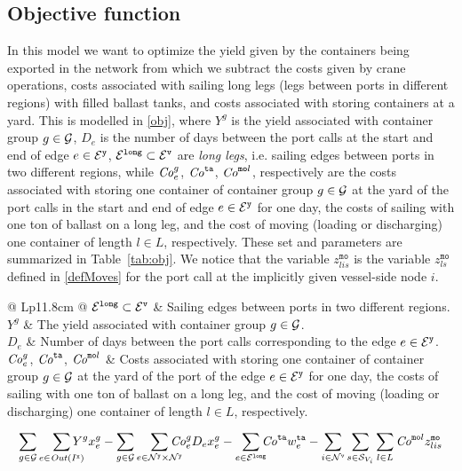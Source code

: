 \subsection{Objective function}
In this model we want to optimize the yield given by the containers being exported in the network from which we subtract the costs given by crane operations, costs associated with sailing long legs (legs between ports in different regions) with filled ballast tanks, and costs associated with storing containers at a yard. This is modelled in \eqref{obj}, where $Y^g$ is the yield associated with container group $g\in\mathcal{G}$, $D_e$ is the number of days between the port calls at the start and end of edge $e\in \mathcal{E}^\texttt{y}$, $\mathcal{E}^\texttt{long}\subset\mathcal{E}^\texttt{v}$ are \emph{long legs}, i.e. sailing edges between ports in two different regions, while $\mathit{Co}^g_{e}$, $\mathit{Co}^\texttt{ta}$, $\mathit{Co}^{\texttt{mo}l}$, respectively are the costs associated with storing one container of container group $g\in\mathcal{G}$ at the yard of the port calls in the start and end of edge $e\in\mathcal{E}^\texttt{y}$ for one day, the costs of sailing with one ton of ballast on a long leg, and the cost of moving (loading or discharging) one container of length $l\in L$, respectively. These set and parameters are summarized in Table~\ref{tab:obj}. {We notice that the variable $z^{\texttt{mo}}_{lis}$ is the variable $z^\texttt{mo}_{ls}$ defined in \eqref{defMoves} for the port call at the implicitly given vessel-side node $i$.}

\begin{table}[width=.9\linewidth,cols=2,pos=htbp]
\caption{set and parameters used in the objective function.}\label{tab:obj}
\begin{tabular*}{\tblwidth}{@{} Lp{11.8cm} @{}}
\toprule
$\mathcal{E}^\texttt{long}\subset\mathcal{E}^\texttt{v}$ & Sailing edges between ports in two different regions.\\
\midrule
$Y^g$ 		& The yield associated with container group $g\in\mathcal{G}$.\\
$D_e$ 		& Number of days between the port calls corresponding to the edge $e\in\mathcal{E}^\texttt{y}$.\\
$\mathit{Co}^g_e$, $\mathit{Co}^\texttt{ta}$, $\mathit{Co}^{\texttt{mo}l}$ 
			& Costs associated with storing one container of container group $g\in\mathcal{G}$ at the yard of the port of the edge $e\in\mathcal{E}^\texttt{y}$ for one day, the costs of sailing with one ton of ballast on a long leg, and the cost of moving (loading or discharging) one container of length $l\in L$, respectively.\\
\bottomrule
\end{tabular*}
\end{table}

\begin{equation}\label{obj}
\sum_{g\in\mc{G}}\so[r]{\sum_{e\in\mi{Out}(I^\ttt{x})}}Y^g x^g_{e} 
- \sum_{g\in\mc{G}}\so[r]{\sum_{e\in \mc{N}^\ttt{y}\times\mc{N}^\ttt{y}}} \mi{Co}^g_e D_e x^g_e 
- \so[r]{\sum_{e\in\mc{E}^\ttt{long}}} \mi{Co}^\ttt{ta} w^\ttt{ta}_e 
-\sum_{i\in \mc{N}^\ttt{v}}\sum_{s\in\mc{S}_{V_i}}\sum_{l\in L} \mi{Co}^{\ttt{mo}l} z^{\ttt{mo}}_{lis}
\end{equation}
